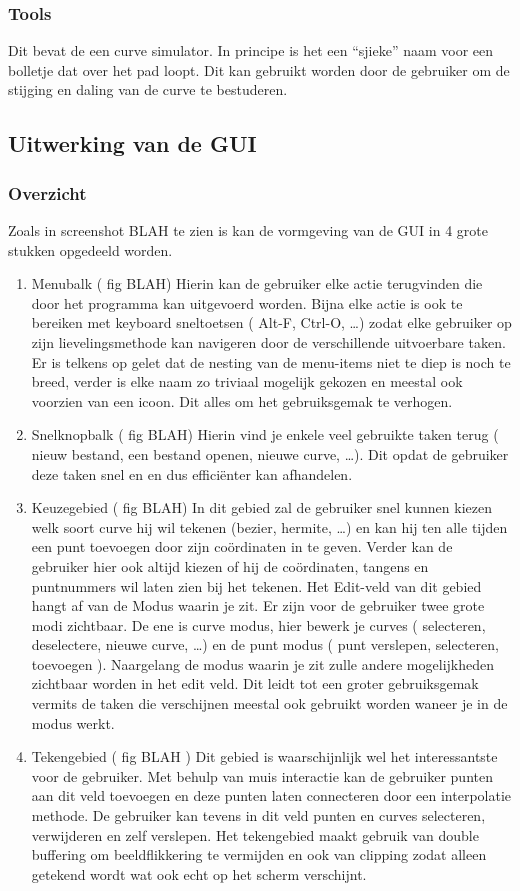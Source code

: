 \documentclass[a4paper,11pt,oneside, titlepage]{article}
\begin{document}
\subsubsection{Tools}
Dit bevat de een curve simulator. In principe is het een ``sjieke'' naam voor een bolletje
dat over het pad loopt. Dit kan gebruikt worden door de gebruiker om de stijging en daling
van de curve te bestuderen.
\subsection{Uitwerking van de GUI}
\subsubsection{Overzicht}

Zoals in screenshot BLAH te zien is kan de vormgeving van de GUI in 4 grote stukken opgedeeld 
worden.
\begin{enumerate}
\item Menubalk ( fig BLAH)
Hierin kan de gebruiker elke actie terugvinden die door het programma kan uitgevoerd worden.
Bijna elke actie is ook te bereiken met keyboard sneltoetsen ( Alt-F, Ctrl-O, \ldots ) zodat
elke gebruiker op zijn lievelingsmethode kan navigeren door de verschillende uitvoerbare taken.
Er is telkens op gelet dat de nesting van de menu-items niet te diep is noch te breed, verder
is elke naam zo triviaal mogelijk gekozen en meestal ook voorzien van een icoon. Dit alles
om het gebruiksgemak te verhogen.
\item Snelknopbalk ( fig BLAH)
Hierin vind je enkele veel gebruikte taken terug ( nieuw bestand, een bestand openen, 
nieuwe curve, \ldots ). Dit opdat de gebruiker deze taken snel en en dus effici\"enter kan
afhandelen.
\item Keuzegebied ( fig BLAH)
In dit gebied zal de gebruiker snel kunnen kiezen welk soort curve hij wil tekenen (bezier, 
hermite, \ldots ) en kan hij ten alle tijden een punt toevoegen door zijn co\"ordinaten in te
geven. Verder kan de gebruiker hier ook altijd kiezen of hij de co\"ordinaten, tangens en 
puntnummers wil laten zien bij het tekenen. \newline
Het Edit-veld van dit gebied hangt af van de Modus waarin je zit. Er zijn voor de gebruiker
twee grote modi zichtbaar. De ene is curve modus, hier bewerk je curves ( selecteren, 
deselectere, nieuwe curve, \ldots ) en de punt modus ( punt verslepen, selecteren, toevoegen ).
Naargelang de modus waarin je zit zulle andere mogelijkheden zichtbaar worden in het edit veld.
Dit leidt tot een groter gebruiksgemak vermits de taken die verschijnen meestal ook gebruikt
worden waneer je in de modus werkt.
\item Tekengebied ( fig BLAH )
Dit gebied is waarschijnlijk wel het interessantste voor de gebruiker. Met behulp van muis
interactie kan de gebruiker punten aan dit veld toevoegen en deze punten laten connecteren
door een interpolatie methode. De gebruiker kan tevens in dit veld punten en curves selecteren,
verwijderen en zelf verslepen. Het tekengebied maakt gebruik van double buffering om 
beeldflikkering te vermijden en ook van clipping zodat alleen getekend wordt wat ook echt
op het scherm verschijnt.
\end{enumerate}
\end{document}
